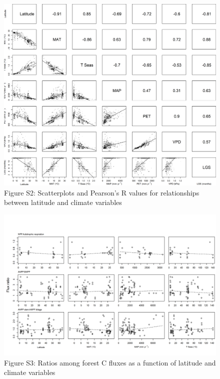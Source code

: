 \documentclass[
]{article}
\begin{document}
\begin{landscape}
\begin{figure}[H]

{\centering \includegraphics[height=0.95\textheight]{tables_figures/climate_regressions} 

}

\caption{Figure S2: Scatterplots and Pearson's R values for relationships between latitude and climate variables}\label{fig:unnamed-chunk-10}
\end{figure}
\end{landscape}

\begin{landscape}
\begin{figure}[H]

{\centering \includegraphics[width=0.8\linewidth]{tables_figures/ratio_grid_plots} 

}

\caption{Figure S3: Ratios among forest C fluxes as a function of latitude and climate variables}\label{fig:unnamed-chunk-11}
\end{figure}
\end{landscape}
\end{document}
